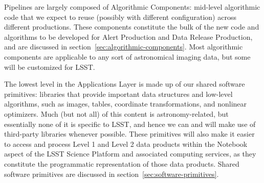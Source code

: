 Pipelines are largely composed of Algorithmic Components: mid-level algorithmic code that we expect to reuse (possibly with different configuration) across different productions.  These components constitute the bulk of the new code and algorithms to be developed for Alert Production and Data Release Production, and are discussed in section~\ref{sec:algorithmic-components}.  Most algorithmic components are applicable to any sort of astronomical imaging data, but some will be customized for LSST.

The lowest level in the Applications Layer is made up of our shared software primitives: libraries that provide important data structures and low-level algorithms, such as images, tables, coordinate transformations, and nonlinear optimizers.  Much (but not all) of this content is astronomy-related, but essentially none of it is specific to LSST, and hence we can and will make use of third-party libraries whenever possible.  These primitives will also make it easier to access and process Level 1 and Level 2 data products within the Notebook aspect of the LSST Science Platform and associated computing services, as they constitute the programmatic representation of those data products.  Shared software primitives are discussed in section~\ref{sec:software-primitives}.
